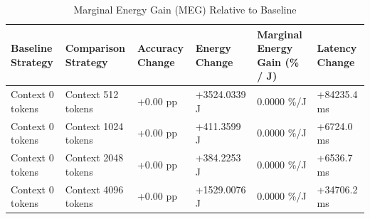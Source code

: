 \begin{table}
\caption{Marginal Energy Gain (MEG) Relative to Baseline}
\label{tab:marginal_energy_gain}
\begin{tabular}{llllll}
\toprule
Baseline Strategy & Comparison Strategy & Accuracy Change & Energy Change & Marginal Energy Gain (\% / J) & Latency Change \\
\midrule
Context 0 tokens & Context 512 tokens & +0.00 pp & +3524.0339 J & 0.0000 \%/J & +84235.4 ms \\
Context 0 tokens & Context 1024 tokens & +0.00 pp & +411.3599 J & 0.0000 \%/J & +6724.0 ms \\
Context 0 tokens & Context 2048 tokens & +0.00 pp & +384.2253 J & 0.0000 \%/J & +6536.7 ms \\
Context 0 tokens & Context 4096 tokens & +0.00 pp & +1529.0076 J & 0.0000 \%/J & +34706.2 ms \\
\bottomrule
\end{tabular}
\end{table}
